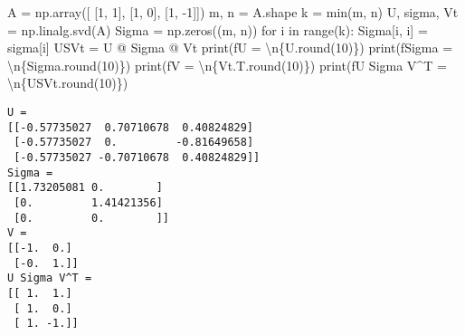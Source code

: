 \documentclass[
  letterpaper,
  DIV=11,
  numbers=noendperiod]{scrreprt}
\newenvironment{Shaded}{\begin{snugshade}}{\end{snugshade}}
\newcommand{\BuiltInTok}[1]{\textcolor[rgb]{0.00,0.23,0.31}{#1}}
\newcommand{\CharTok}[1]{\textcolor[rgb]{0.13,0.47,0.30}{#1}}
\newcommand{\ControlFlowTok}[1]{\textcolor[rgb]{0.00,0.23,0.31}{#1}}
\newcommand{\DecValTok}[1]{\textcolor[rgb]{0.68,0.00,0.00}{#1}}
\newcommand{\KeywordTok}[1]{\textcolor[rgb]{0.00,0.23,0.31}{#1}}
\newcommand{\NormalTok}[1]{\textcolor[rgb]{0.00,0.23,0.31}{#1}}
\newcommand{\OperatorTok}[1]{\textcolor[rgb]{0.37,0.37,0.37}{#1}}
\newcommand{\SpecialCharTok}[1]{\textcolor[rgb]{0.37,0.37,0.37}{#1}}
\newcommand{\SpecialStringTok}[1]{\textcolor[rgb]{0.13,0.47,0.30}{#1}}
\begin{document}
\begin{Shaded}
\begin{Highlighting}[]
\NormalTok{A }\OperatorTok{=}\NormalTok{ np.array([}
\NormalTok{    [}\DecValTok{1}\NormalTok{, }\DecValTok{1}\NormalTok{],}
\NormalTok{    [}\DecValTok{1}\NormalTok{, }\DecValTok{0}\NormalTok{],}
\NormalTok{    [}\DecValTok{1}\NormalTok{, }\OperatorTok{{-}}\DecValTok{1}\NormalTok{]])}
\NormalTok{m, n }\OperatorTok{=}\NormalTok{ A.shape}
\NormalTok{k }\OperatorTok{=} \BuiltInTok{min}\NormalTok{(m, n)}
\NormalTok{U, sigma, Vt }\OperatorTok{=}\NormalTok{ np.linalg.svd(A)}
\NormalTok{Sigma }\OperatorTok{=}\NormalTok{ np.zeros((m, n))}
\ControlFlowTok{for}\NormalTok{ i }\KeywordTok{in} \BuiltInTok{range}\NormalTok{(k):}
\NormalTok{    Sigma[i, i] }\OperatorTok{=}\NormalTok{ sigma[i]}
\NormalTok{USVt }\OperatorTok{=}\NormalTok{ U }\OperatorTok{@}\NormalTok{ Sigma }\OperatorTok{@}\NormalTok{ Vt}
\BuiltInTok{print}\NormalTok{(}\SpecialStringTok{f\textquotesingle{}U = }\CharTok{\textbackslash{}n}\SpecialCharTok{\{}\NormalTok{U}\SpecialCharTok{.}\BuiltInTok{round}\NormalTok{(}\DecValTok{10}\NormalTok{)}\SpecialCharTok{\}}\SpecialStringTok{\textquotesingle{}}\NormalTok{)}
\BuiltInTok{print}\NormalTok{(}\SpecialStringTok{f\textquotesingle{}Sigma = }\CharTok{\textbackslash{}n}\SpecialCharTok{\{}\NormalTok{Sigma}\SpecialCharTok{.}\BuiltInTok{round}\NormalTok{(}\DecValTok{10}\NormalTok{)}\SpecialCharTok{\}}\SpecialStringTok{\textquotesingle{}}\NormalTok{)}
\BuiltInTok{print}\NormalTok{(}\SpecialStringTok{f\textquotesingle{}V = }\CharTok{\textbackslash{}n}\SpecialCharTok{\{}\NormalTok{Vt}\SpecialCharTok{.}\NormalTok{T}\SpecialCharTok{.}\BuiltInTok{round}\NormalTok{(}\DecValTok{10}\NormalTok{)}\SpecialCharTok{\}}\SpecialStringTok{\textquotesingle{}}\NormalTok{)}
\BuiltInTok{print}\NormalTok{(}\SpecialStringTok{f\textquotesingle{}U Sigma V\^{}T = }\CharTok{\textbackslash{}n}\SpecialCharTok{\{}\NormalTok{USVt}\SpecialCharTok{.}\BuiltInTok{round}\NormalTok{(}\DecValTok{10}\NormalTok{)}\SpecialCharTok{\}}\SpecialStringTok{\textquotesingle{}}\NormalTok{)}
\end{Highlighting}
\end{Shaded}

\begin{verbatim}
U = 
[[-0.57735027  0.70710678  0.40824829]
 [-0.57735027  0.         -0.81649658]
 [-0.57735027 -0.70710678  0.40824829]]
Sigma = 
[[1.73205081 0.        ]
 [0.         1.41421356]
 [0.         0.        ]]
V = 
[[-1.  0.]
 [-0.  1.]]
U Sigma V^T = 
[[ 1.  1.]
 [ 1.  0.]
 [ 1. -1.]]
\end{verbatim}
\end{document}
